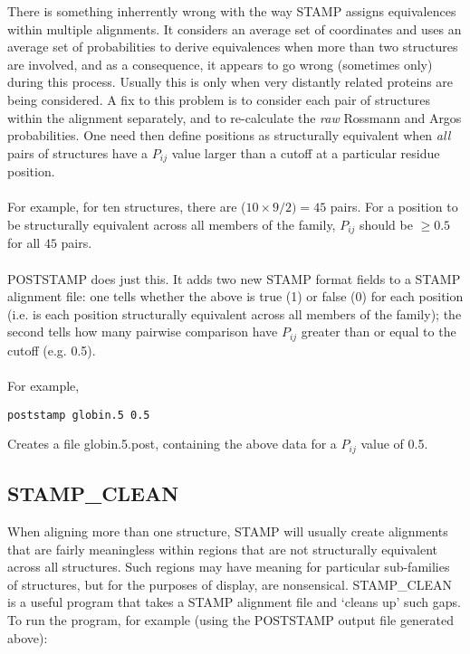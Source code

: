 There is something inherrently wrong with the way STAMP assigns 
equivalences within multiple alignments.  It considers an average set of 
\Cal coordinates and uses an average set of probabilities to derive 
equivalences when more than two structures are involved, and as a 
consequence, it appears to go wrong (sometimes only) during this process.  
Usually this is only when very distantly related proteins are being 
considered.  A fix to this problem is to consider each pair of structures 
within the alignment separately, and to re-calculate the {\em raw} 
Rossmann and Argos probabilities.  One need then define positions as 
structurally equivalent when {\em all} pairs of structures have a 
$P_{ij}$ value larger than a cutoff at a particular residue position.\\
\\
For example, for ten structures, there are ($10 \times 9/2) = 45$ pairs.  
For a position to be structurally equivalent across all members of the 
family, $P_{ij}$ should be $ \geq 0.5$ for all $45$ pairs.  \\
\\
POSTSTAMP does just this.  It adds two new STAMP format fields to a STAMP
alignment file: one tells 
whether the above is true (1) or false (0) for each position (i.e. is 
each position structurally equivalent across all members of the family); 
the second tells how many pairwise comparison have $P_{ij}$ greater than 
or equal to the cutoff (e.g. 0.5).\\
\\
For example, \\

\begin{scriptsize}\begin{verbatim}
poststamp globin.5 0.5
\end{verbatim} \end{scriptsize}

Creates a file globin.5.post, containing the above data for a $P_{ij}$ 
value of 0.5.\\

\subsection{STAMP\_CLEAN}

When aligning more than one structure, STAMP will usually create 
alignments that are fairly meaningless within regions that are not 
structurally equivalent across all structures.  Such regions may have 
meaning for particular sub-families of structures, but for the purposes 
of display, are nonsensical.  STAMP\_CLEAN is a useful program that 
takes a STAMP alignment file and `cleans up' such gaps.  To run the
program, for example (using the POSTSTAMP output file generated above):\\

